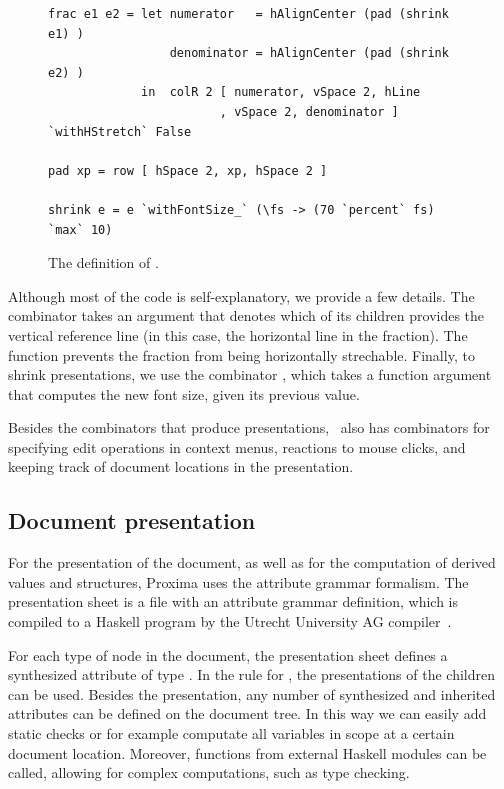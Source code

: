 \documentclass[12pt]{article}
\begin{document}
\begin{figure}
\begin{center}
\begin{footnotesize}
\begin{verbatim}
frac e1 e2 = let numerator   = hAlignCenter (pad (shrink e1) )
                 denominator = hAlignCenter (pad (shrink e2) )
             in  colR 2 [ numerator, vSpace 2, hLine
                        , vSpace 2, denominator ] `withHStretch` False
                        
pad xp = row [ hSpace 2, xp, hSpace 2 ]

shrink e = e `withFontSize_` (\fs -> (70 `percent` fs) `max` 10)
\end{verbatim}
\end{footnotesize}
\caption{The definition of .} \label{fig:xprezFrac} 
\end{center}
\end{figure}

Although most of the code is self-explanatory, we provide a few details. The  combinator takes an argument that denotes which of its children provides the vertical reference line (in this case, the horizontal line in the fraction). The  function prevents the fraction from being horizontally strechable. Finally, to shrink presentations, we use the combinator , which takes a function argument that computes the new font size, given its previous value.

Besides the combinators that produce presentations, \Xprez\ also has combinators for specifying edit operations in context menus, reactions to mouse clicks, and keeping track of document locations in the presentation.


\subsection{Document presentation}

For the presentation of the document, as well as for the computation of derived values and structures, Proxima uses the attribute grammar formalism. The presentation sheet is a file with an attribute grammar definition, which is compiled to a Haskell program by the Utrecht University AG compiler~\cite{swierstra08ag}.

For each type of node in the document, the presentation sheet defines a synthesized attribute  of type . In the rule for , the presentations of the children can be used. Besides the presentation, any number of synthesized and inherited attributes can be defined on the document tree. In this way we can easily add static checks or for example computate all variables in scope at a certain document location. Moreover, functions from external Haskell modules can be called, allowing for complex computations, such as type checking.
\end{document}

